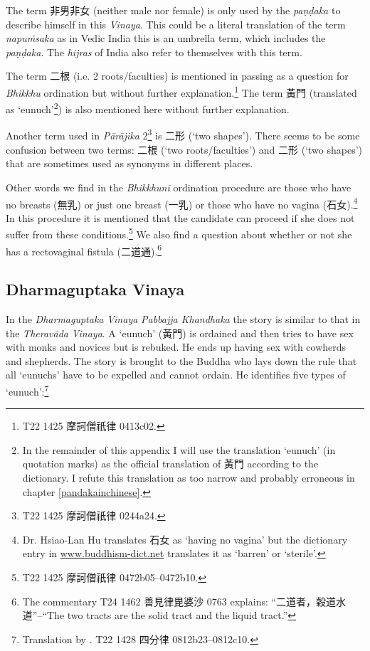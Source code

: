 The term 非男非女 (neither male nor female) is only used by the \textit{paṇḍaka} to describe himself in this \textit{Vinaya}. This could be a literal translation of the term \textit{napuṁsaka} as in Vedic India this is an umbrella term, which includes the \textit{paṇḍaka}. The \textit{hijras} of India also refer to themselves with this term.

The term 二根 (i.e. 2 roots/faculties) is mentioned in passing as a question for \textit{Bhikkhu} ordination but without further explanation.\footnote{T22 1425 摩訶僧祇律 0413c02.} The term 黃門 (translated as `eunuch'\footnote{In the remainder of this appendix I will use the translation `eunuch' (in quotation marks) as the official translation of 黃門 according to the dictionary. I refute this translation as too narrow and probably erroneous in chapter \ref{pandakainchinese}.}) is also mentioned here without further explanation.

Another term used in \textit{Pārājika} 2\footnote{T22 1425 摩訶僧祇律 0244a24.} is 二形 (`two shapes'). There seems to be some confusion between two terms: 二根 (`two roots/faculties') and 二形 (`two shapes') that are sometimes used as synonyms in different places.

Other words we find in the \textit{Bhikkhunī} ordination procedure are those who have no breasts (無乳) or just one breast (一乳) or those who have no vagina (石女).\footnote{Dr. Hsiao-Lan Hu translates 石女 as `having no vagina' but the dictionary entry in \href{http://www.buddhism-dict.net/cgi-bin/xpr-ddb.pl?q=石女}{www.buddhism-dict.net} translates it as `barren' or `sterile'.} In this procedure it is mentioned that the candidate can proceed if she does not suffer from these conditions.\footnote{T22 1425 摩訶僧祇律 0472b05–0472b10.} We also find a question about whether or not she has a rectovaginal fistula (二道通).\footnote{The commentary T24 1462 善見律毘婆沙 0763 explains: ``二道者，穀道水道''--``The two tracts are the solid tract and the liquid tract.''}

\subsection{Dharmaguptaka Vinaya}
In the \textit{Dharmaguptaka} \textit{Vinaya} \textit{Pabbajja Khandhaka} the story is similar to that in the \textit{Theravāda} \textit{Vinaya}. A `eunuch' (黃門) is ordained and then tries to have sex with monks and novices but is rebuked. He ends up having sex with cowherds and shepherds. The story is brought to the Buddha who lays down the rule that all `eunuchs' have to be expelled and cannot ordain. He identifies five types of `eunuch':\footnote{Translation by \cite{bodhi}. T22 1428 四分律 0812b23–0812c10.} 

